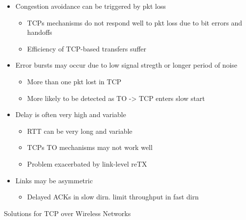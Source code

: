 \begin{itemize}
	\item Congestion avoidance can be triggered by pkt loss
	\begin{itemize}
		\item TCPs mechanisms do not respond well to pkt loss due to bit
			errors and handoffs
		\item Efficiency of TCP-based transfers suffer
	\end{itemize}
	\item Error bursts may occur due to low signal stregth or longer period
		of noise
	\begin{itemize}
		\item More than one pkt lost in TCP
		\item More likely to be detected as TO -> TCP enters slow start
	\end{itemize}
	\item Delay is often very high and variable
	\begin{itemize}
		\item RTT can be very long and variable
		\item TCPs TO mechanisms may not work well
		\item Problem exacerbated by link-level reTX
	\end{itemize}
	\item Links may be asymmetric
	\begin{itemize}
		\item Delayed ACKs in slow dirn. limit throughput in fast dirn
	\end{itemize}
\end{itemize}
Solutions for TCP over Wireless Networks
